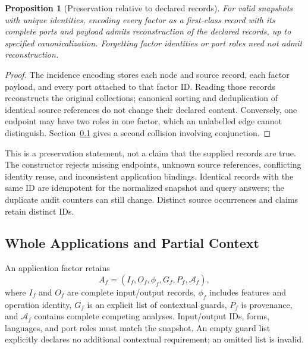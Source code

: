 \documentclass{article}
\newtheorem{proposition}{Proposition}
\begin{document}
\begin{proposition}[Preservation relative to declared records]
For valid snapshots with unique identities, encoding every factor as a first-class record with its complete ports and payload admits reconstruction of the declared records, up to specified canonicalization. Forgetting factor identities or port roles need not admit reconstruction.
\end{proposition}
\begin{proof}
The incidence encoding stores each node and source record, each factor payload, and every port attached to that factor ID. Reading those records reconstructs the original collections; canonical sorting and deduplication of identical source references do not change their declared content. Conversely, one endpoint may have two roles in one factor, which an unlabelled edge cannot distinguish. Section~\ref{sec:applications} gives a second collision involving conjunction.
\end{proof}

This is a preservation statement, not a claim that the supplied records are true. The constructor rejects missing endpoints, unknown source references, conflicting identity reuse, and inconsistent application bindings. Identical records with the same ID are idempotent for the normalized snapshot and query answers; the duplicate audit counters can still change. Distinct source occurrences and claims retain distinct IDs.

\subsection{Whole Applications and Partial Context}
\label{sec:applications}

An application factor retains
\begin{equation}
 A_f=(I_f,O_f,\phi_f,G_f,P_f,\mathcal{A}_f),
\end{equation}
where $I_f$ and $O_f$ are complete input/output records, $\phi_f$ includes features and operation identity, $G_f$ is an explicit list of contextual guards, $P_f$ is provenance, and $\mathcal{A}_f$ contains complete competing analyses. Input/output IDs, forms, languages, and port roles must match the snapshot. An empty guard list explicitly declares no additional contextual requirement; an omitted list is invalid.
\end{document}
